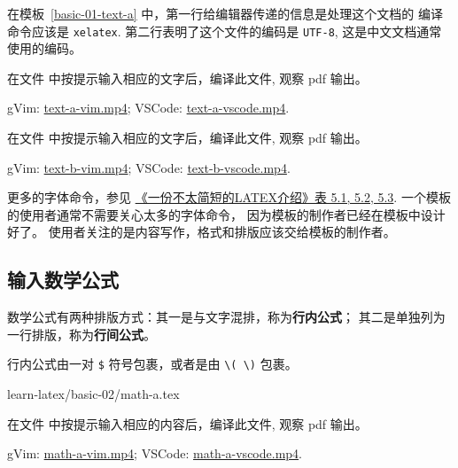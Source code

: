 \documentclass[
    11pt,
    base=hide,
    cite=authoryear,
    device=phone,
    lang=cn,
    mode=simple,
    result=answer,
    toc=onecol,
]{elegantbook_sierxue}
\begin{document}
在模板~\ref{basic-01-text-a} 中，第一行给编辑器传递的信息是处理这个文档的
编译命令应该是 \texttt{xelatex}.
第二行表明了这个文件的编码是 \texttt{UTF-8}, 这是中文文档通常使用的编码。

\begin{exercise}\label{ex:text-a}
    在文件 
    中按提示输入相应的文字后，编译此文件, 观察 pdf 输出。
\end{exercise}
\begin{cast}\label{cast:text-a}
    gVim: \href{media/casts/text-a.mp4}{text-a-vim.mp4};
    VSCode: \href{media/casts/text-a.mp4}{text-a-vscode.mp4}.
\end{cast}

\begin{exercise}\label{ex:text-b}
    在文件 
    中按提示输入相应的文字后，编译此文件, 观察 pdf 输出。
\end{exercise}
\begin{cast}\label{cast:text-b}
    gVim: \href{media/casts/text-b.mp4}{text-b-vim.mp4};
    VSCode: \href{media/casts/text-b.mp4}{text-b-vscode.mp4}.
\end{cast}
\begin{share}\label{share:user-designer}
    更多的字体命令，参见
    \hyperlink{books/lshort-zh-cn.pdf.74}%
    {《一份不太简短的LATEX介绍》表 5.1, 5.2, 5.3}.
    一个模板的使用者通常不需要关心太多的字体命令，
    因为模板的制作者已经在模板中设计好了。
    使用者关注的是内容写作，格式和排版应该交给模板的制作者。
\end{share}

\subsection{输入数学公式}%
\label{sub:latex-math}

\begin{latex}\label{tex:math}
    数学公式有两种排版方式：其一是与文字混排，称为\textbf{行内公式}；
    其二是单独列为一行排版，称为\textbf{行间公式}。
\end{latex}

\begin{latex}\label{tex:math-inline}
    行内公式由一对 \texttt{\$} 符号包裹，或者是由 \lstinline|\( \)| 包裹。
\end{latex}
%
{learn-latex/basic-02/math-a.tex}
\begin{exercise}\label{ex:math-a}
    在文件 
    中按提示输入相应的内容后，编译此文件, 观察 pdf 输出。
\end{exercise}
\begin{cast}\label{cast:math-a}
    gVim: \href{media/casts/math-a.mp4}{math-a-vim.mp4};
    VSCode: \href{media/casts/math-a.mp4}{math-a-vscode.mp4}.
\end{cast}
\end{document}
